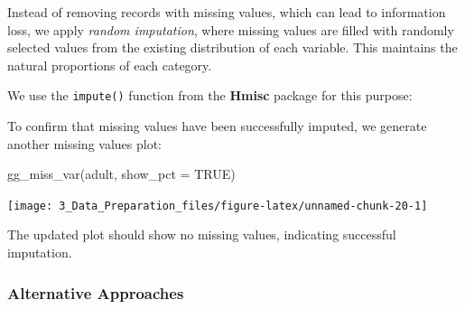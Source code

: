 \documentclass[
  11pt,
]{book}
\makeatletter
\newenvironment{Shaded}{}{}
\newcommand{\AttributeTok}[1]{#1}
\newcommand{\CommentTok}[1]{\textcolor[rgb]{0.36,0.36,0.36}{#1}}
\newcommand{\ConstantTok}[1]{#1}
\newcommand{\FunctionTok}[1]{#1}
\newcommand{\NormalTok}[1]{#1}
\newcommand{\OtherTok}[1]{\textcolor[rgb]{0.39,0.39,0.39}{#1}}
\newcommand{\SpecialCharTok}[1]{\textcolor[rgb]{0.39,0.39,0.39}{#1}}
\newcommand{\StringTok}[1]{\textcolor[rgb]{0.39,0.39,0.39}{#1}}
\newenvironment{kframe}{%
\medskip{}
\setlength{\fboxsep}{.8em}
 \def\at@end@of@kframe{}%
 \ifinner\ifhmode%
  \def\at@end@of@kframe{\end{minipage}}%
  \begin{minipage}{\columnwidth}%
 \fi\fi%
 \def\FrameCommand##1{\hskip\@totalleftmargin \hskip-\fboxsep
 \colorbox{shadecolor}{##1}\hskip-\fboxsep
     \hskip-\linewidth \hskip-\@totalleftmargin \hskip\columnwidth}%
 \MakeFramed {\advance\hsize-\width
   \@totalleftmargin\z@ \linewidth\hsize
   \@setminipage}}%
 {\par\unskip\endMakeFramed%
 \at@end@of@kframe}
\renewenvironment{Shaded}{\begin{kframe}}{\end{kframe}}
\theoremstyle{definition}
\theoremstyle{definition}
\theoremstyle{definition}
\theoremstyle{definition}
\theoremstyle{remark}
\makeatother
\begin{document}
Instead of removing records with missing values, which can lead to information loss, we apply \emph{random imputation}, where missing values are filled with randomly selected values from the existing distribution of each variable. This maintains the natural proportions of each category.

We use the \texttt{impute()} function from the \textbf{Hmisc} package for this purpose:

\begin{Shaded}
\end{Shaded}

To confirm that missing values have been successfully imputed, we generate another missing values plot:

\begin{Shaded}
\begin{Highlighting}[]
\FunctionTok{gg\_miss\_var}\NormalTok{(adult, }\AttributeTok{show\_pct =} \ConstantTok{TRUE}\NormalTok{)}
\end{Highlighting}
\end{Shaded}

\begin{center}\texttt{[image: 3\_Data\_Preparation\_files/figure-latex/unnamed-chunk-20-1]} \end{center}

The updated plot should show no missing values, indicating successful imputation.

\subsubsection*{Alternative Approaches}\label{alternative-approaches}
\end{document}

